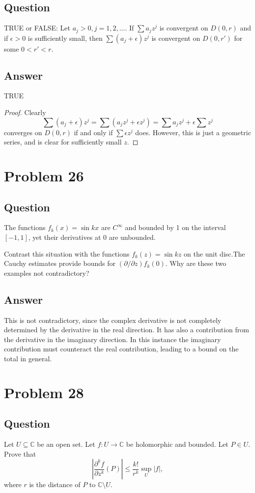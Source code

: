\documentclass[11pt]{article}
\begin{document}
\subsection{Question}
TRUE or FALSE: Let $a_j >0, j=1,2,\dots.$ If $\sum a_j z^j$ is convergent on $D(0,r)$ and if $\epsilon >0$ is sufficiently small, then $\sum(a_j+ \epsilon) z^j$ is convergent on $D(0,r')$ for some $0<r'<r$.
\subsection{Answer}
TRUE

\begin{proof}Clearly
\[\sum(a_j + \epsilon) z^j = \sum( a_j z^j + \epsilon z^j) =\sum a_j z^j +\epsilon \sum  z^j \]
converges  on $D(0,r)$ if and only if $\sum \epsilon z^j$ does. However, this is just a geometric series, and is clear for sufficiently small $z$.
\end{proof}

\section{Problem 26}
\subsection{Question}
The functions $f_k (x) = \sin k x $ are $C^\infty$ and bounded by 1 on the interval $[-1,1]$, yet their derivatives at 0 are unbounded.

Contrast this situation with the functions $f_k(z) = \sin k z $ on the unit disc.The Cauchy estimates provide bounds for $(\partial/\partial z) f_k(0)$. Why are these two examples not contradictory?
\subsection{Answer}
This is not contradictory, since the complex derivative is not completely determined by the derivative in the real direction. It has also a contribution from the derivative in the imaginary direction. In this instance the imaginary contribution must counteract the real contribution, leading to a bound on the total in general.

\section{Problem 28}
\subsection{Question}
Let $U \subseteq \mathbb{C}$ be an open set. Let $f: U \to \mathbb{C}$ be holomorphic and bounded. Let $P \in U$. Prove that
\[\left| \frac{\partial^k f}{\partial z^k } (P) \right| \leq \frac{k!}{r^k} \sup_U|f|,\]
where $r$ is the distance of $P$ to $\mathbb{C} \setminus U$.
\end{document}
